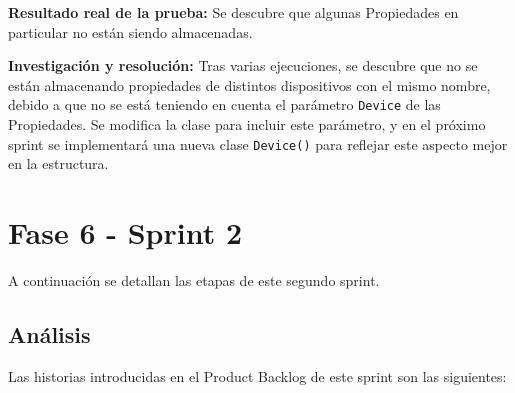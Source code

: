 \begin{itemize}
\textbf{Resultado real de la prueba:} Se descubre que algunas Propiedades en particular no están siendo almacenadas. 

\textbf{Investigación y resolución:} Tras varias ejecuciones, se descubre que no se están almacenando propiedades de distintos dispositivos con el mismo nombre, debido a que no se está teniendo en cuenta el parámetro \texttt{Device} de las Propiedades. Se modifica la clase para incluir este parámetro, y en el próximo sprint se implementará una nueva clase \texttt{Device()} para reflejar este aspecto mejor en la estructura.

\end{itemize}

\newpage

\section{Fase 6 - Sprint 2}

A continuación se detallan las etapas de este segundo sprint.

\subsection{Análisis}

Las historias introducidas en el Product Backlog de este sprint son las siguientes:

